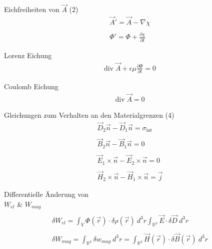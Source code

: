 \documentclass[a6paper]{kartei}
\renewcommand{\div}{\mathrm{div}\;}
\begin{document}
	\begin{karte}{Eichfreiheiten von $\vec A$ (2)}
		\begin{eqnarray*}
			\vec A' = \vec A - \nabla \chi \\\\
			\Phi' = \Phi + \frac{\partial \chi}{\partial t}
		\end{eqnarray*}
	\end{karte}


	\begin{karte}{Lorenz Eichung}
		\begin{eqnarray*}
			\div \vec A + \epsilon \mu \frac{\partial \Phi}{\partial t} = 0
		\end{eqnarray*}
	\end{karte}

	\begin{karte}{Coulomb Eichung}
		\begin{eqnarray*}
			\div \vec A = 0
		\end{eqnarray*}
	\end{karte}

	\begin{karte}[Potentialtheorie]{Gleichungen zum Verhalten an den Materialgrenzen (4)}
		\begin{eqnarray*}
			\vec D_2 \vec n - \vec D_1 \vec n = \sigma_{\text{int}} \\\\
			\vec B_2 \vec n - \vec B_1 \vec n = 0 \\\\
			\vec E_1 \times \vec n - \vec E_2 \times \vec n = 0 \\\\
			\vec H_2 \times \vec n - \vec H_1 \times \vec n = \vec j
		\end{eqnarray*}
	\end{karte}





%
	\begin{karte}{Differentielle Änderung von \\$W_{el}$ \&  $W_{mag}$}
	 \begin{eqnarray*}\\
	  \delta W_{el} = \int_{V} \Phi(\vec{r}) \cdot \delta \rho(\vec{r}) \ d^{3}r  \int_{\mathbb{R}^{3}} \vec{E} \cdot \delta \vec{D} \ d^{3}r    \\\\
 \delta W_{mag} = \int_{\mathbb{R}^3} \delta w_{mag} \ d^{3}r = \int_{\mathbb{R}^3} \vec{H}(\vec{r}) \cdot \delta \vec{B}(\vec{r}) \ d^{3}r
\end{eqnarray*}
	\end{karte}
\end{document}
